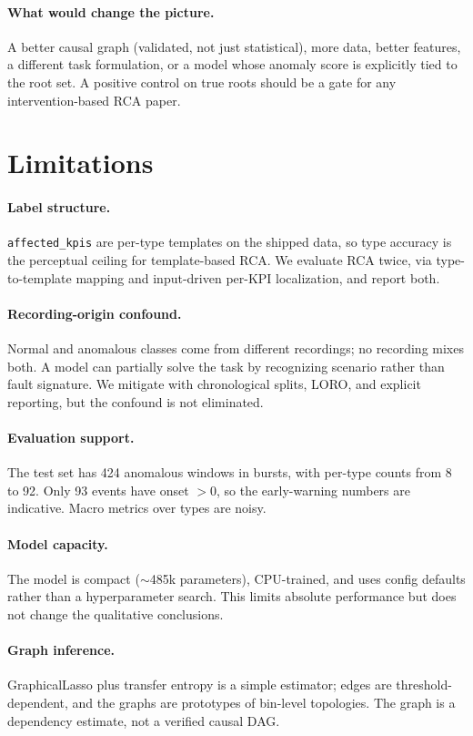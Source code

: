 \documentclass[conference]{IEEEtran}
\begin{document}
\paragraph{What would change the picture.}
A better causal graph (validated, not just statistical), more data, better features, a different task formulation, or a model whose anomaly score is explicitly tied to the root set. A positive control on true roots should be a gate for any intervention-based RCA paper.

\section{Limitations}

\paragraph{Label structure.}
\texttt{affected\_kpis} are per-type templates on the shipped data, so type accuracy is the perceptual ceiling for template-based RCA. We evaluate RCA twice, via type-to-template mapping and input-driven per-KPI localization, and report both.

\paragraph{Recording-origin confound.}
Normal and anomalous classes come from different recordings; no recording mixes both. A model can partially solve the task by recognizing scenario rather than fault signature. We mitigate with chronological splits, LORO, and explicit reporting, but the confound is not eliminated.

\paragraph{Evaluation support.}
The test set has 424 anomalous windows in bursts, with per-type counts from 8 to 92. Only 93 events have onset $>0$, so the early-warning numbers are indicative. Macro metrics over types are noisy.

\paragraph{Model capacity.}
The model is compact ($\sim$485k parameters), CPU-trained, and uses config defaults rather than a hyperparameter search. This limits absolute performance but does not change the qualitative conclusions.

\paragraph{Graph inference.}
GraphicalLasso plus transfer entropy is a simple estimator; edges are threshold-dependent, and the graphs are prototypes of bin-level topologies. The graph is a dependency estimate, not a verified causal DAG.
\end{document}

